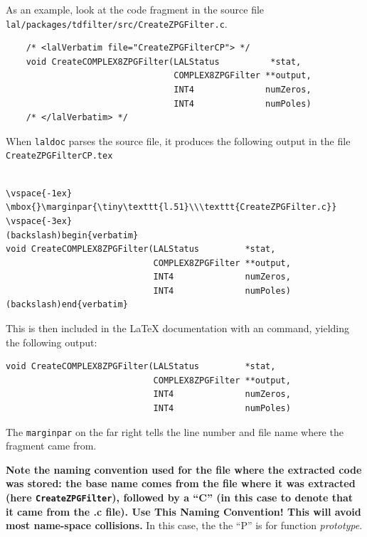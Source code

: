 \documentclass[oneside]{book}
\begin{document}
As an example, look at the code fragment in the source file 
\texttt{lal/packages/tdfilter/src/CreateZPGFilter.c}.

\begin{verbatim}
    /* <lalVerbatim file="CreateZPGFilterCP"> */
    void CreateCOMPLEX8ZPGFilter(LALStatus          *stat,
                                 COMPLEX8ZPGFilter **output,
                                 INT4              numZeros,
                                 INT4              numPoles)
    /* </lalVerbatim> */
\end{verbatim}
When {\tt laldoc} parses the source file, it produces the following
output in the file {\tt CreateZPGFilterCP.tex}

\begin{verbatim}

\vspace{-1ex}
\mbox{}\marginpar{\tiny\texttt{l.51}\\\texttt{CreateZPGFilter.c}}
\vspace{-3ex}
(backslash)begin{verbatim}
void CreateCOMPLEX8ZPGFilter(LALStatus         *stat,
                             COMPLEX8ZPGFilter **output,
                             INT4              numZeros,
                             INT4              numPoles)
(backslash)end{verbatim}
\end{verbatim}

This is then included in the {\LaTeX} documentation with an
\verb@@ command, yielding the following
output:

\vspace{-1ex}
\mbox{}
\vspace{-3ex}
\begin{verbatim}
void CreateCOMPLEX8ZPGFilter(LALStatus         *stat,
                             COMPLEX8ZPGFilter **output,
                             INT4              numZeros,
                             INT4              numPoles)
\end{verbatim}

The {\tt marginpar} on the far right tells the line number and file
name where the fragment came from.

{\bf Note the naming convention used for the file where the extracted
code was stored: the base name comes from the file where it was
extracted (here {\texttt {CreateZPGFilter}}), followed by a ``C'' (in
this case to denote that it came from the .c file).  {\Large {Use This
Naming Convention!}} This will avoid most name-space collisions.}  In
this case,  the the ``P'' is for function {\it prototype}.
\end{document}
